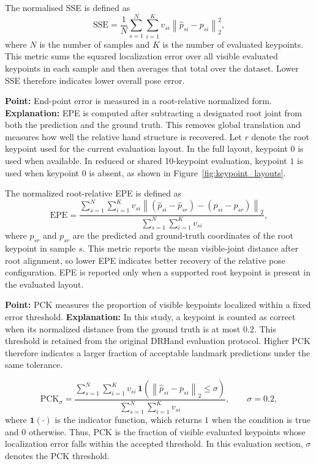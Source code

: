 \documentclass[10pt,letterpaper]{article}
\begin{document}
The normalised SSE is defined as
\begin{equation}
\mathrm{SSE} =
\frac{1}{N}
\sum_{s=1}^{N}
\sum_{i=1}^{K}
v_{si}\left\|
\hat{p}_{si} - p_{si}
\right\|_2^2,
\label{eq:sse}
\end{equation}
where \(N\) is the number of samples and \(K\) is the number of evaluated keypoints. This metric sums the squared localization error over all visible evaluated keypoints in each sample and then averages that total over the dataset. Lower SSE therefore indicates lower overall pose error.

\medskip
\noindent\textbf{Point:} End-point error is measured in a root-relative normalized form.  
\textbf{Explanation:} EPE is computed after subtracting a designated root joint from both the prediction and the ground truth. This removes global translation and measures how well the relative hand structure is recovered. Let \(r\) denote the root keypoint used for the current evaluation layout. In the full layout, keypoint \(0\) is used when available. In reduced or shared 10-keypoint evaluation, keypoint \(1\) is used when keypoint \(0\) is absent, as shown in Figure~\ref{fig:keypoint_layouts}.

The normalized root-relative EPE is defined as
\begin{equation}
\mathrm{EPE} =
\frac{
\sum_{s=1}^{N}
\sum_{i=1}^{K}
v_{si}
\left\|
(\hat{p}_{si} - \hat{p}_{sr}) - (p_{si} - p_{sr})
\right\|_2
}{
\sum_{s=1}^{N}
\sum_{i=1}^{K}
v_{si}
},
\label{eq:epe}
\end{equation}
where \(\hat{p}_{sr}\) and \(p_{sr}\) are the predicted and ground-truth coordinates of the root keypoint in sample \(s\). This metric reports the mean visible-joint distance after root alignment, so lower EPE indicates better recovery of the relative pose configuration. EPE is reported only when a supported root keypoint is present in the evaluated layout.

\medskip
\noindent\textbf{Point:} PCK measures the proportion of visible keypoints localized within a fixed error threshold.  
\textbf{Explanation:} In this study, a keypoint is counted as correct when its normalized distance from the ground truth is at most \(0.2\). This threshold is retained from the original DRHand evaluation protocol. Higher PCK therefore indicates a larger fraction of acceptable landmark predictions under the same tolerance.

\begin{equation}
\mathrm{PCK}_{\sigma} =
\frac{
\sum_{s=1}^{N}
\sum_{i=1}^{K}
v_{si}\,\mathbf{1}
\left(
\left\|
\hat{p}_{si} - p_{si}
\right\|_2 \le \sigma
\right)
}{
\sum_{s=1}^{N}
\sum_{i=1}^{K}
v_{si}
},
\qquad \sigma = 0.2,
\label{eq:pck}
\end{equation}
where \(\mathbf{1}(\cdot)\) is the indicator function, which returns \(1\) when the condition is true and \(0\) otherwise. Thus, PCK is the fraction of visible evaluated keypoints whose localization error falls within the accepted threshold. In this evaluation section, \(\sigma\) denotes the PCK threshold.
\end{document}
